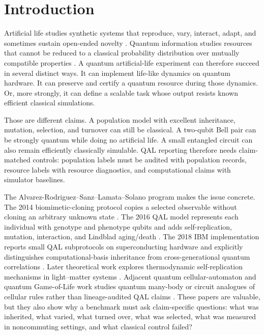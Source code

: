 \documentclass[11pt]{article}
\begin{document}
\section{Introduction}

Artificial life studies synthetic systems that reproduce, vary, interact, adapt, and sometimes sustain open-ended novelty \citep{vonneumann1966self,bedau2003artificial,ray1992tierra,ofria2004avida,lenski2003evolutionary,bullock2006exploring,banzhaf2016defining,packard2019overview,dolson2019modes}. Quantum information studies resources that cannot be reduced to a classical probability distribution over mutually compatible properties \citep{wootters1982single,barnum1996noncommuting,bell1964einstein,clauser1969proposed,chitambar2019quantum}. A quantum artificial-life experiment can therefore succeed in several distinct ways. It can implement life-like dynamics on quantum hardware. It can preserve and certify a quantum resource during those dynamics. Or, more strongly, it can define a scalable task whose output resists known efficient classical simulations.

Those are different claims. A population model with excellent inheritance, mutation, selection, and turnover can still be classical. A two-qubit Bell pair can be strongly quantum while doing no artificial life. A small entangled circuit can also remain efficiently classically simulable. QAL reporting therefore needs claim-matched controls: population labels must be audited with population records, resource labels with resource diagnostics, and computational claims with simulator baselines.

The Alvarez-Rodriguez--Sanz--Lamata--Solano program makes the issue concrete. The 2014 biomimetic-cloning protocol copies a selected observable without cloning an arbitrary unknown state \citep{alvarez2014biomimetic}. The 2016 QAL model represents each individual with genotype and phenotype qubits and adds self-replication, mutation, interaction, and Lindblad aging/death \citep{alvarez2016artificial,lindblad1976generators}. The 2018 IBM implementation reports small QAL subprotocols on superconducting hardware and explicitly distinguishes computational-basis inheritance from cross-generational quantum correlations \citep{alvarez2018ibm}. Later theoretical work explores thermodynamic self-replication mechanisms in light--matter systems \citep{valente2021self,lamata2020perspective}. Adjacent quantum cellular-automaton and quantum Game-of-Life work studies quantum many-body or circuit analogues of cellular rules rather than lineage-audited QAL claims \citep{bleh2012quantum,ney2022entanglement,escanez2026qgol}. These papers are valuable, but they also show why a benchmark must ask claim-specific questions: what was inherited, what varied, what turned over, what was selected, what was measured in noncommuting settings, and what classical control failed?
\end{document}
